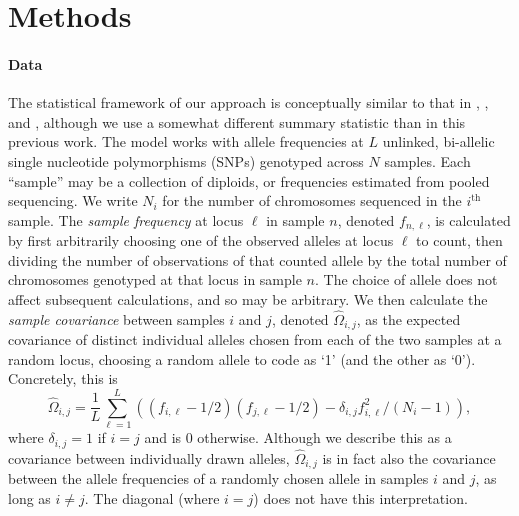 \documentclass[12pt]{article}
\newcommand{\plr}[1]{{\it\color{purple}{(#1)}}}
\begin{document}
\section*{Methods}

\paragraph{Data}
The statistical framework of our approach is conceptually similar to that in \cite{Wasser2004}, \cite{BEDASSLE}, and \cite{spacemix},
although we use a somewhat different summary statistic than in this previous work.
The model works with allele frequencies at $L$ unlinked, bi-allelic single nucleotide polymorphisms (SNPs) genotyped across $N$ samples.
Each ``sample'' may be a collection of diploids, or frequencies estimated from pooled sequencing.
We write $N_i$ for the number of chromosomes sequenced in the $i^\text{th}$ sample.
The \emph{sample frequency} at locus $\ell$ in sample $n$, denoted $f_{n,\ell}$, 
is calculated by first arbitrarily choosing one of the observed alleles at locus $\ell$ to count, 
then dividing the number of observations of that counted allele by the total number of chromosomes genotyped at that locus
in sample $n$.
The choice of allele does not affect subsequent calculations, and so may be arbitrary.
\plr{How about calling what we calculate the ``allelic covariance''?  ``individual covariance''?}
We then calculate the \emph{sample covariance} between samples $i$ and $j$, denoted $\widehat{\Omega}_{i,j}$,
as the expected covariance of distinct individual alleles chosen from each of the two samples at a random locus,
choosing a random allele to code as `1' (and the other as `0').
Concretely, this is
\begin{equation}
\widehat{\Omega}_{i,j} = 
    \frac{1}{L} \sum_{\ell=1}^L \left( (f_{i,\ell}-1/2) (f_{j,\ell}-1/2) - \delta_{i,j} f_{i,\ell}^2 / (N_i-1) \right),
\label{sample_covariance}
\end{equation}
where $\delta_{i,j}=1$ if $i=j$ and is 0 otherwise.
Although we describe this as a covariance between individually drawn alleles,
$\widehat{\Omega}_{i,j}$ is in fact also the covariance between the allele frequencies
of a randomly chosen allele in samples $i$ and $j$, as long as $i \neq j$.
The diagonal (where $i=j$) does not have this interpretation.
\end{document}
